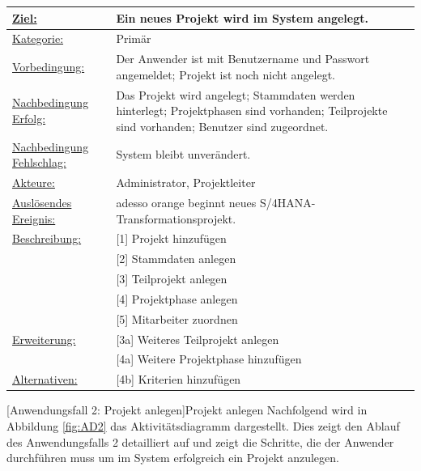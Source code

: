 \begin{tabularx}{\textwidth}{|p{}|p{}|}
        \hline
        \underline{Ziel:} & Ein neues Projekt wird im System angelegt.\\\hline
        \underline{Kategorie:} & Primär\\\hline
        \underline{Vorbedingung:} & Der Anwender ist mit Benutzername und Passwort angemeldet; Projekt ist noch nicht angelegt.\\\hline
        \underline{Nachbedingung Erfolg:} & Das Projekt wird angelegt; Stammdaten werden hinterlegt; Projektphasen sind vorhanden; Teilprojekte sind vorhanden; Benutzer sind zugeordnet.\\\hline
        \underline{Nachbedingung Fehlschlag:} & System bleibt unverändert.\\\hline
        \underline{Akteure:} & Administrator, Projektleiter\\\hline
        \underline{Auslösendes Ereignis:} & adesso orange beginnt neues S/4HANA-Transformationsprojekt.\\\hline        
        \multirow{1}{*}{\underline{Beschreibung:}} & [1] Projekt hinzufügen\\
        & [2] Stammdaten anlegen\\
        & [3] Teilprojekt anlegen\\
        & [4] Projektphase anlegen\\
        & [5] Mitarbeiter zuordnen\\\hline
        \multirow{1}{*}{\underline{Erweiterung:}} & [3a] Weiteres Teilprojekt anlegen\\
        & [4a] Weitere Projektphase hinzufügen\\\hline
        \underline{Alternativen:} & [4b] Kriterien hinzufügen\\\hline
\end{tabularx}
[Anwendungsfall 2: Projekt anlegen]{Projekt anlegen}
\newpage
Nachfolgend wird in Abbildung \ref{fig:AD2} das Aktivitätsdiagramm dargestellt. Dies zeigt den Ablauf des Anwendungsfalls 2 detailliert auf und zeigt die Schritte, die der Anwender durchführen muss um im System erfolgreich ein Projekt anzulegen.
